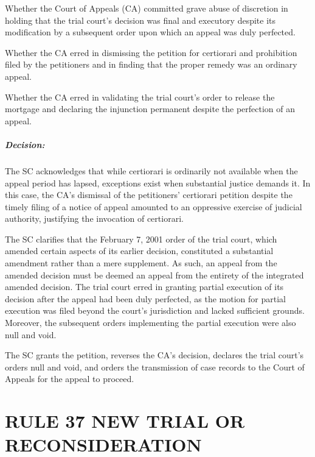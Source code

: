 \documentclass[
12pt,
oneside,
onehalfspacing,
headsepline
]{DigestCollection}
\begin{document}
Whether the Court of Appeals (CA) committed grave abuse of discretion in holding that the trial court's decision was final and executory despite its modification by a subsequent order upon which an appeal was duly perfected.

Whether the CA erred in dismissing the petition for certiorari and prohibition filed by the petitioners and in finding that the proper remedy was an ordinary appeal.

Whether the CA erred in validating the trial court's order to release the mortgage and declaring the injunction permanent despite the perfection of an appeal.

\paragraph{Decision:}
\label{89eaab40-1256-11ef-aa24-9916ea601717}


The SC acknowledges that while certiorari is ordinarily not available when the appeal period has lapsed, exceptions exist when substantial justice demands it. In this case, the CA's dismissal of the petitioners' certiorari petition despite the timely filing of a notice of appeal amounted to an oppressive exercise of judicial authority, justifying the invocation of certiorari.

The SC clarifies that the February 7, 2001 order of the trial court, which amended certain aspects of its earlier decision, constituted a substantial amendment rather than a mere supplement. As such, an appeal from the amended decision must be deemed an appeal from the entirety of the integrated amended decision. The trial court erred in granting partial execution of its decision after the appeal had been duly perfected, as the motion for partial execution was filed beyond the court's jurisdiction and lacked sufficient grounds. Moreover, the subsequent orders implementing the partial execution were also null and void.

The SC grants the petition, reverses the CA's decision, declares the trial court's orders null and void, and orders the transmission of case records to the Court of Appeals for the appeal to proceed.

\chapter{RULE 37 NEW TRIAL OR RECONSIDERATION}
\label{c0145150-0a16-11ef-932c-63c852f65e48}


\label{d6423660-124d-11ef-aa24-9916ea601717}
\end{document}
